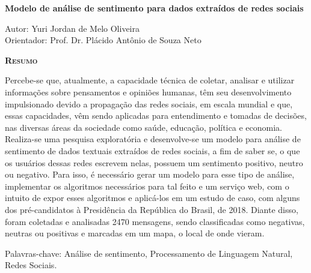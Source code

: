 \begin{center}
	{\Large{\textbf{Modelo de análise de sentimento para dados extraídos de redes sociais}}}
\end{center}

\vspace{1cm}

\begin{flushright}
	Autor: Yuri Jordan de Melo Oliveira\\
	Orientador: Prof. Dr. Plácido Antônio de Souza Neto
\end{flushright}

\vspace{1cm}

\begin{center}
	\Large{\textsc{\textbf{Resumo}}}
\end{center}

\noindent Percebe-se que, atualmente, a capacidade técnica de coletar, analisar e utilizar informações sobre pensamentos e opiniões humanas, têm seu desenvolvimento impulsionado devido a propagação das redes sociais, em escala mundial e que, essas capacidades, vêm sendo aplicadas para entendimento e tomadas de decisões, nas diversas áreas da sociedade como saúde, educação, política e economia. Realiza-se uma pesquisa exploratória e desenvolve-se um modelo para análise de sentimento de dados textuais extraídos de redes sociais, a fim de saber se, o que os usuários dessas redes escrevem nelas, possuem um sentimento positivo, neutro ou negativo. Para isso, é necessário gerar um modelo para esse tipo de análise, implementar os algoritmos necessários para tal feito e um serviço web, com o intuito de expor esses algoritmos e aplicá-los em um estudo de caso, com alguns dos pré-candidatos à Presidência da República do Brasil, de 2018. Diante disso, foram coletadas e analisadas 2470 mensagens, sendo classificadas como negativas, neutras ou positivas e marcadas em um mapa, o local de onde vieram.

\noindent Palavras-chave: Análise de sentimento, Processamento de Linguagem Natural, Redes Sociais.




